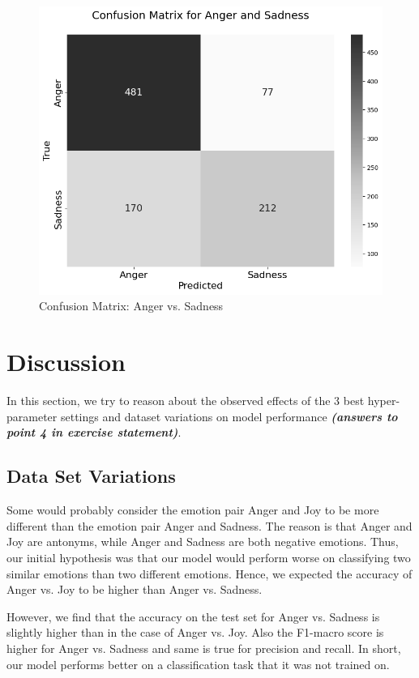 \documentclass[fleqn,10pt]{SelfArx} %
\begin{document}
{\begin{figure}[ht]\centering
	\includegraphics[width=\linewidth]{Figures/confusion_matrix_eset2.png}
	\caption{Confusion Matrix: Anger vs. Sadness}
	\label{fig:cm_eset2}
\end{figure}

\section{Discussion}
In this section, we try to reason about the observed effects of the 3 best hyper-parameter settings and dataset variations on model performance \textit{\textbf{(answers to point 4 in exercise statement)}}.

\subsection{Data Set Variations}
Some would probably consider the emotion pair Anger and Joy to be more different than the emotion pair Anger and Sadness. The reason is that Anger and Joy are antonyms, while Anger and Sadness are both negative emotions. Thus, our initial hypothesis was that our model would perform worse on classifying two similar emotions than two different emotions. Hence, we expected the accuracy of Anger vs. Joy to be higher than Anger vs. Sadness.

However, we find that the accuracy on the test set for Anger vs. Sadness is slightly higher than in the case of Anger vs. Joy. Also the F1-macro score is higher for Anger vs. Sadness and same is true for precision and recall. In short, our model performs better on a classification task that it was not trained on.

}
\end{document}
